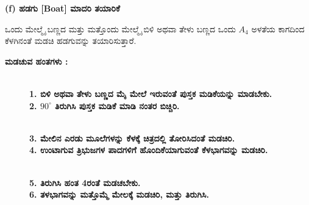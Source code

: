 \noindent
\textbf{(f) ಹಡಗು [Boat] ಮಾದರಿ ತಯಾರಿಕೆ}%

ಒಂದು ಮೇಲ್ಮೈ ಬಣ್ಣದ ಮತ್ತು ಮತ್ತೊಂದು ಮೇಲ್ಮೈ ಬಿಳಿ ಅಥವಾ ತೇಳು ಬಣ್ಣದ \hbox{ಒಂದು} $A_4$ ಅಳತೆಯ ಕಾಗದಿಂದ ಕೆಳಗಿನಂತೆ ಮಡಚಿ ಹಡಗುವನ್ನು ತಯಾರಿಸುತ್ತಾರೆ. 


\noindent
\textbf{ಮಡಚುವ ಹಂತಗಳು :}
\begin{figure}[H]
\\
\textbf{1. ಬಿಳಿ ಅಥವಾ ತೇಳು ಬಣ್ಣದ ಮೈ ಮೇಲೆ ಇರುವಂತೆ ಪುಸ್ತಕ ಮಡಿಕೆಯನ್ನು ಮಾಡಬೇಕು.}\\
\textbf{2. $90^{\circ}$ ತಿರುಗಿಸಿ ಪುಸ್ತಕ ಮಡಿಕೆ ಮಾಡಿ ನಂತರ ಬಿಚ್ಚಿರಿ.}
\end{figure}
 \begin{figure}[H]
\\
\textbf{3. ಮೇಲಿನ ಎರಡು ಮೂಲೆಗಳನ್ನು ಕೆಳಕ್ಕೆ ಚಿತ್ರದಲ್ಲಿ ತೋರಿಸಿದಂತೆ ಮಡಚಿರಿ.}\\
\textbf{4. ಉಂಟಾಗುವ ತ್ರಿಭುಜಗಳ ಪಾದಗಳಿಗೆ ಹೊಂದಿಕೆಯಾಗುವಂತೆ ಕೆಳಭಾಗವನ್ನು ಮಡಚಿರಿ.}
\end{figure}
\begin{figure}[H]
\\
\textbf{5. ತಿರುಗಿಸಿ ಹಂತ 4ರಂತೆ ಮಡಚಬೇಕು.}\\
\textbf{6. ತಳಭಾಗವನ್ನು ಮತ್ತೊಮ್ಮೆ ಮೇಲಕ್ಕೆ ಮಡಚಿರಿ, ಮತ್ತು ತಿರುಗಿಸಿ.}
\end{figure}
